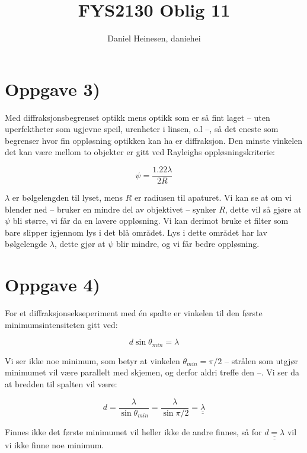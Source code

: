 \documentclass[a4paper,norsk, 10pt]{article}
\title{FYS2130 Oblig 11}
\author{Daniel Heinesen, daniehei}
\begin{document}
\maketitle

\section*{Oppgave 3)}

Med diffraksjonsbegrenset optikk mens optikk som er så fint laget -- uten uperfektheter som ugjevne speil, urenheter i linsen, o.l --, så det eneste som begrenser hvor fin oppløsning optikken kan ha er diffraksjon. Den minste vinkelen det kan være mellom to objekter er gitt ved Rayleighs oppløsningskriterie:

\begin{equation}
\psi = \frac{1.22 \lambda}{2R}
\end{equation}

$\lambda$ er bølgelengden til lyset, mens $R$ er radiusen til apaturet. Vi kan se at om vi blender ned -- bruker en mindre del av objektivet -- synker $R$, dette vil så gjøre at $\psi$ bli større, vi får da en lavere oppløsning. Vi kan derimot bruke et filter som bare slipper igjennom lys i det blå området. Lys i dette området har lav bølgelengde $\lambda$, dette gjør at $\psi$ blir mindre, og vi får bedre oppløsning.

\section*{Oppgave 4)}
For et diffraksjonsekseperiment med én spalte er vinkelen til den første minimumsintensiteten gitt ved:

\begin{equation}
 d\sin\theta_{min} = \lambda
 \end{equation} 

Vi ser ikke noe minimum, som betyr at vinkelen $\theta_{min} = \pi/2$ -- strålen som utgjør minimumet vil være parallelt med skjemen, og derfor aldri treffe den --. Vi ser da at bredden til spalten vil være:

\begin{equation}
d = \frac{\lambda}{\sin\theta_{min}} = \frac{\lambda}{\sin\pi/2} = \underline{\underline{\lambda}}
\end{equation}

Finnes ikke det første minimumet vil heller ikke de andre finnes, så for $\underline{\underline{d = \lambda}}$ vil vi ikke finne noe minimum.
\end{document}

